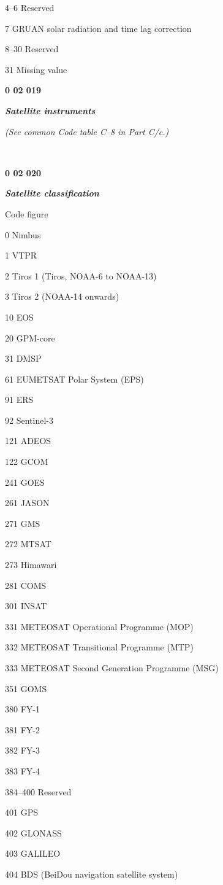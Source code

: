 4--6 Reserved

7 GRUAN solar radiation and time lag correction

8--30 Reserved

31 Missing value

\textbf{0 02 019}

\emph{\textbf{Satellite instruments}}

\emph{(See common Code table C--8 in Part C/c.)}

\textbf{\\
}

\textbf{0 02 020}

\emph{\textbf{Satellite classification}}

Code figure

0 Nimbus

1 VTPR

2 Tiros 1 (Tiros, NOAA-6 to NOAA-13)

3 Tiros 2 (NOAA-14 onwards)

10 EOS

20 GPM-core

31 DMSP

61 EUMETSAT Polar System (EPS)

91 ERS

92 Sentinel-3

121 ADEOS

122 GCOM

241 GOES

261 JASON

271 GMS

272 MTSAT

273 Himawari

281 COMS

301 INSAT

331 METEOSAT Operational Programme (MOP)

332 METEOSAT Transitional Programme (MTP)

333 METEOSAT Second Generation Programme (MSG)

351 GOMS

380 FY-1

381 FY-2

382 FY-3

383 FY-4

384--400 Reserved

401 GPS

402 GLONASS

403 GALILEO

404 BDS (BeiDou navigation satellite system)

